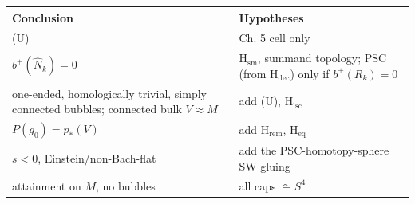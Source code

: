 \documentclass[
  10pt,
]{report}
\begin{document}
\begin{longtable}[]{@{}ll@{}}
\toprule
\begin{minipage}[b]{0.47\columnwidth}\raggedright
Conclusion\strut
\end{minipage} & \begin{minipage}[b]{0.47\columnwidth}\raggedright
Hypotheses\strut
\end{minipage}\tabularnewline
\midrule
\endhead
\begin{minipage}[t]{0.47\columnwidth}\raggedright
(U)\strut
\end{minipage} & \begin{minipage}[t]{0.47\columnwidth}\raggedright
Ch. 5 cell only\strut
\end{minipage}\tabularnewline
\begin{minipage}[t]{0.47\columnwidth}\raggedright
\(b^+(\widehat N_k)=0\)\strut
\end{minipage} & \begin{minipage}[t]{0.47\columnwidth}\raggedright
\(\mathrm{H_{sm}}\), summand topology; PSC (from \(\mathrm{H_{dec}}\))
only if \(b^+(R_k)=0\)\strut
\end{minipage}\tabularnewline
\begin{minipage}[t]{0.47\columnwidth}\raggedright
one-ended, homologically trivial, simply connected bubbles; connected
bulk \(V\approx M\)\strut
\end{minipage} & \begin{minipage}[t]{0.47\columnwidth}\raggedright
add (U), \(\mathrm{H_{lsc}}\)\strut
\end{minipage}\tabularnewline
\begin{minipage}[t]{0.47\columnwidth}\raggedright
\(P(g_0)=p_*(V)\)\strut
\end{minipage} & \begin{minipage}[t]{0.47\columnwidth}\raggedright
add \(\mathrm{H_{rem}}\), \(\mathrm{H_{eq}}\)\strut
\end{minipage}\tabularnewline
\begin{minipage}[t]{0.47\columnwidth}\raggedright
\(s<0\), Einstein/non-Bach-flat\strut
\end{minipage} & \begin{minipage}[t]{0.47\columnwidth}\raggedright
add the PSC-homotopy-sphere SW gluing\strut
\end{minipage}\tabularnewline
\begin{minipage}[t]{0.47\columnwidth}\raggedright
attainment on \(M\), no bubbles\strut
\end{minipage} & \begin{minipage}[t]{0.47\columnwidth}\raggedright
all caps \(\cong S^4\)\strut
\end{minipage}\tabularnewline
\bottomrule
\end{longtable}
\end{document}
